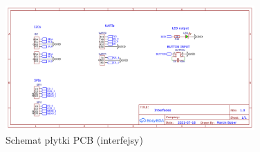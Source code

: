                \begin{landscape}
                    \begin{figure}
                      \centering
                      \includegraphics[width=0.85\textwidth]{img/pcb3.png}
                      \caption{Schemat płytki PCB (interfejsy)}
                      \label{fig:pcb_schematic_3}
                    \end{figure}
                \end{landscape}
        
    
    
